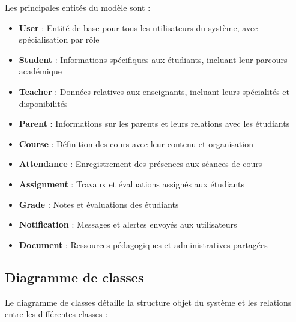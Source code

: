 Les principales entités du modèle sont :

\begin{itemize}
  \item \textbf{User} : Entité de base pour tous les utilisateurs du système, avec spécialisation par rôle
  
  \item \textbf{Student} : Informations spécifiques aux étudiants, incluant leur parcours académique
  
  \item \textbf{Teacher} : Données relatives aux enseignants, incluant leurs spécialités et disponibilités
  
  \item \textbf{Parent} : Informations sur les parents et leurs relations avec les étudiants
  
  \item \textbf{Course} : Définition des cours avec leur contenu et organisation
  
  \item \textbf{Attendance} : Enregistrement des présences aux séances de cours
  
  \item \textbf{Assignment} : Travaux et évaluations assignés aux étudiants
  
  \item \textbf{Grade} : Notes et évaluations des étudiants
  
  \item \textbf{Notification} : Messages et alertes envoyés aux utilisateurs
  
  \item \textbf{Document} : Ressources pédagogiques et administratives partagées
\end{itemize}

\subsection{Diagramme de classes}

Le diagramme de classes détaille la structure objet du système et les relations entre les différentes classes :

